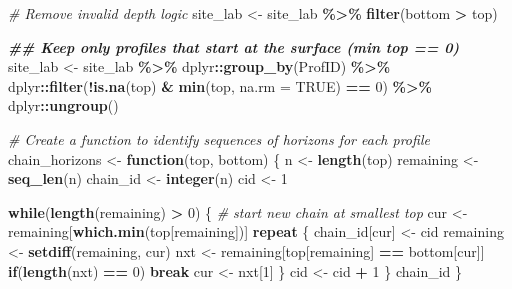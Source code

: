 \documentclass[
  10pt,
  b5paper,
  oneside]{book}
\newenvironment{Shaded}{\begin{snugshade}}{\end{snugshade}}
\newcommand{\AttributeTok}[1]{\textcolor[rgb]{0.13,0.29,0.53}{#1}}
\newcommand{\CommentTok}[1]{\textcolor[rgb]{0.56,0.35,0.01}{\textit{#1}}}
\newcommand{\ConstantTok}[1]{\textcolor[rgb]{0.56,0.35,0.01}{#1}}
\newcommand{\ControlFlowTok}[1]{\textcolor[rgb]{0.13,0.29,0.53}{\textbf{#1}}}
\newcommand{\DecValTok}[1]{\textcolor[rgb]{0.00,0.00,0.81}{#1}}
\newcommand{\DocumentationTok}[1]{\textcolor[rgb]{0.56,0.35,0.01}{\textbf{\textit{#1}}}}
\newcommand{\FunctionTok}[1]{\textcolor[rgb]{0.13,0.29,0.53}{\textbf{#1}}}
\newcommand{\NormalTok}[1]{#1}
\newcommand{\OtherTok}[1]{\textcolor[rgb]{0.56,0.35,0.01}{#1}}
\newcommand{\SpecialCharTok}[1]{\textcolor[rgb]{0.81,0.36,0.00}{\textbf{#1}}}
\begin{document}
\begin{Shaded}
\begin{Highlighting}[]
\CommentTok{\# Remove invalid depth logic}
\NormalTok{site\_lab }\OtherTok{\textless{}{-}}\NormalTok{ site\_lab }\SpecialCharTok{\%\textgreater{}\%}
  \FunctionTok{filter}\NormalTok{(bottom }\SpecialCharTok{\textgreater{}}\NormalTok{ top)}

\DocumentationTok{\#\# Keep only profiles that start at the surface (min top == 0)}
\NormalTok{site\_lab }\OtherTok{\textless{}{-}}\NormalTok{ site\_lab }\SpecialCharTok{\%\textgreater{}\%}
\NormalTok{  dplyr}\SpecialCharTok{::}\FunctionTok{group\_by}\NormalTok{(ProfID) }\SpecialCharTok{\%\textgreater{}\%}
\NormalTok{  dplyr}\SpecialCharTok{::}\FunctionTok{filter}\NormalTok{(}\SpecialCharTok{!}\FunctionTok{is.na}\NormalTok{(top) }\SpecialCharTok{\&} \FunctionTok{min}\NormalTok{(top, }\AttributeTok{na.rm =} \ConstantTok{TRUE}\NormalTok{) }\SpecialCharTok{==} \DecValTok{0}\NormalTok{) }\SpecialCharTok{\%\textgreater{}\%}
\NormalTok{  dplyr}\SpecialCharTok{::}\FunctionTok{ungroup}\NormalTok{()}


\CommentTok{\# Create a function to identify sequences of horizons for each profile}
\NormalTok{chain\_horizons }\OtherTok{\textless{}{-}} \ControlFlowTok{function}\NormalTok{(top, bottom) \{}
\NormalTok{  n }\OtherTok{\textless{}{-}} \FunctionTok{length}\NormalTok{(top)}
\NormalTok{  remaining }\OtherTok{\textless{}{-}} \FunctionTok{seq\_len}\NormalTok{(n)}
\NormalTok{  chain\_id }\OtherTok{\textless{}{-}} \FunctionTok{integer}\NormalTok{(n)}
\NormalTok{  cid }\OtherTok{\textless{}{-}} \DecValTok{1}
  
  \ControlFlowTok{while}\NormalTok{(}\FunctionTok{length}\NormalTok{(remaining) }\SpecialCharTok{\textgreater{}} \DecValTok{0}\NormalTok{) \{}
    \CommentTok{\# start new chain at smallest top}
\NormalTok{    cur }\OtherTok{\textless{}{-}}\NormalTok{ remaining[}\FunctionTok{which.min}\NormalTok{(top[remaining])]}
    \ControlFlowTok{repeat}\NormalTok{ \{}
\NormalTok{      chain\_id[cur] }\OtherTok{\textless{}{-}}\NormalTok{ cid}
\NormalTok{      remaining }\OtherTok{\textless{}{-}} \FunctionTok{setdiff}\NormalTok{(remaining, cur)}
\NormalTok{      nxt }\OtherTok{\textless{}{-}}\NormalTok{ remaining[top[remaining] }\SpecialCharTok{==}\NormalTok{ bottom[cur]]}
      \ControlFlowTok{if}\NormalTok{(}\FunctionTok{length}\NormalTok{(nxt) }\SpecialCharTok{==} \DecValTok{0}\NormalTok{) }\ControlFlowTok{break}
\NormalTok{      cur }\OtherTok{\textless{}{-}}\NormalTok{ nxt[}\DecValTok{1}\NormalTok{]}
\NormalTok{    \}}
\NormalTok{    cid }\OtherTok{\textless{}{-}}\NormalTok{ cid }\SpecialCharTok{+} \DecValTok{1}
\NormalTok{  \}}
\NormalTok{  chain\_id}
\NormalTok{\}}


\end{Highlighting}
\end{Shaded}
\end{document}
